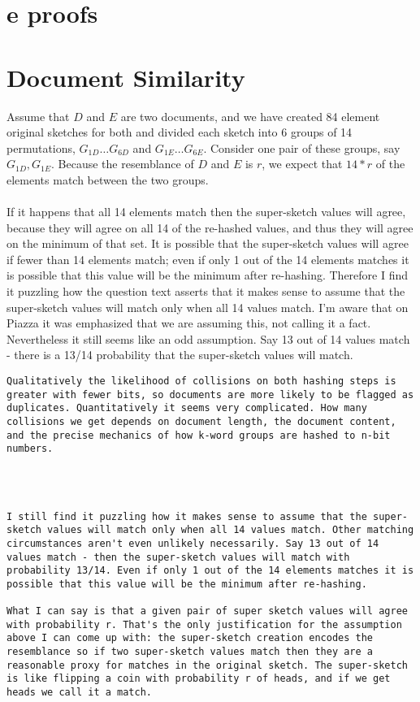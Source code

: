 \documentclass[11pt]{article}
\begin{document}
\section{e proofs}

\section{Document Similarity}
Assume that $D$ and $E$ are two documents, and we have created 84 element original sketches for both and divided each sketch into 6 groups of 14 permutations, $G_{1D} \dots G_{6D}$ and $G_{1E} \dots G_{6E}$. Consider one pair of these groups, say $G_{1D}, G_{1E}$. Because the resemblance of $D$ and $E$ is $r$, we expect that $14 * r$ of the elements match between the two groups.
\\
\\
If it happens that all 14 elements match then the super-sketch values will agree, because they will agree on all 14 of the re-hashed values, and thus they will agree on the minimum of that set. It is possible that the super-sketch values will agree if fewer than 14 elements match; even if only 1 out of the 14 elements matches it is possible that this value will be the minimum after re-hashing. Therefore I find it puzzling how the question text asserts that it makes sense to assume that the super-sketch values will match only when all 14 values match. I'm aware that on Piazza it was emphasized that we are assuming this, not calling it a fact. Nevertheless it still seems like an odd assumption. Say 13 out of 14 values match - there is a 13/14 probability that the super-sketch values will match.

\begin{verbatim}
Qualitatively the likelihood of collisions on both hashing steps is greater with fewer bits, so documents are more likely to be flagged as duplicates. Quantitatively it seems very complicated. How many collisions we get depends on document length, the document content, and the precise mechanics of how k-word groups are hashed to n-bit numbers.




I still find it puzzling how it makes sense to assume that the super-sketch values will match only when all 14 values match. Other matching circumstances aren't even unlikely necessarily. Say 13 out of 14 values match - then the super-sketch values will match with probability 13/14. Even if only 1 out of the 14 elements matches it is possible that this value will be the minimum after re-hashing.

What I can say is that a given pair of super sketch values will agree with probability r. That's the only justification for the assumption above I can come up with: the super-sketch creation encodes the resemblance so if two super-sketch values match then they are a reasonable proxy for matches in the original sketch. The super-sketch is like flipping a coin with probability r of heads, and if we get heads we call it a match.
\end{verbatim}
\end{document}
